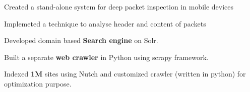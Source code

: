 \documentclass[a4paper]{deedy-resume-openfont}
\begin{document}
\begin{minipage}[t]{0.63\textwidth}
\begin{tightemize}
\item Created a stand-alone system for deep packet inspection in mobile devices
\item Implemeted a technique to analyse header and content of packets
\end{tightemize}
\sectionsep

\begin{tightemize}
\item Developed domain based \textbf{Search engine} on Solr.
\item Built a separate \textbf{web crawler} in Python using scrapy framework.
\item Indexed \textbf{1M} sites using Nutch and customized crawler (written in python) for optimization purpose.
\end{tightemize}
\sectionsep

\sectionsep




\end{minipage}
\end{document}
